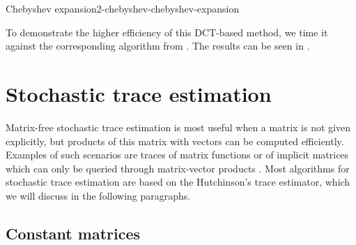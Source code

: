 \begin{algo}{Chebyshev expansion}{2-chebyshev-chebyshev-expansion}
    
\end{algo}

To demonstrate the higher efficiency of this \gls{DCT}-based method, we time it
against the corresponding algorithm from \cite{lin2017randomized}. The results
can be seen in .

\begin{table}[ht]
    \caption{Comparison of the runtime in milliseconds of the two approaches for computing the coefficients
        of the Chebyshev expansion of a function. We average over 7 runs of the
        algorithms and repeat these runs 1000 times to form the mean and standard
        deviation which are given in the below table. We refer to
        \cite[algorithm~1]{lin2017randomized} with \enquote{quadrature}
        and to  with \enquote{DCT}.
        For each algorithm, we interpolate a Gaussian \gls{smoothing-kernel} with \gls{smoothing-parameter} $=0.05$,
        at \gls{num-evaluation-points} $=1000$ points, for various values of \gls{chebyshev-degree}.}
    \label{tab:2-chebyshev-timing-interpolation}
   
\end{table}


\section{Stochastic trace estimation}
\label{sec:2-chebyshev-stochastic-trace-estimation}

Matrix-free stochastic trace estimation is most useful when a matrix is not given
explicitly, but products of this matrix with vectors can be computed
efficiently. Examples of such scenarios are traces of matrix functions
\cite{ubaru2017lanczos,epperly2023xtrace} or of implicit matrices which can only
be queried through matrix-vector products \cite{ghorbani2019investigation,adepu2021hessian}.
Most algorithms for stochastic trace estimation are based on the Hutchinson's
trace estimator, which we will discuss in the following paragraphs.\\

\subsection{Constant matrices}
\label{subsec:2-chebyshev-trace-constant}

